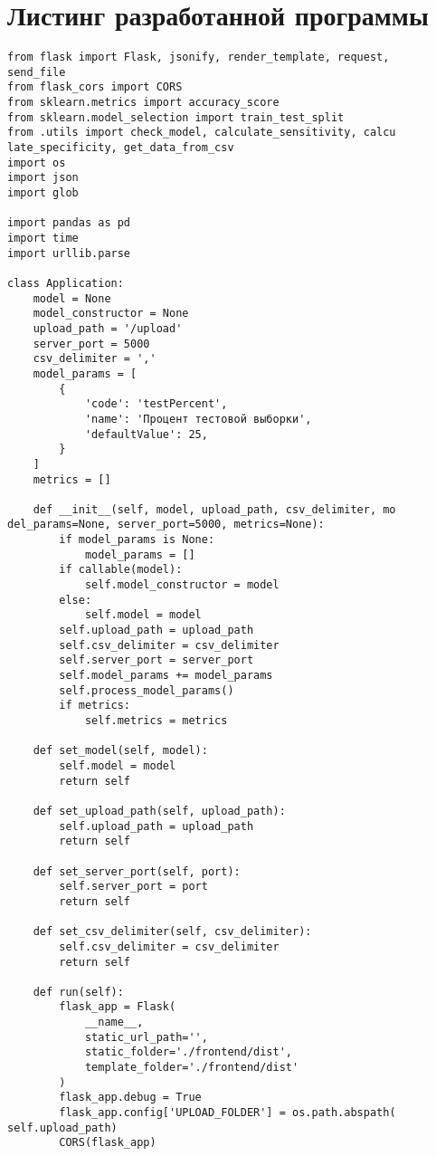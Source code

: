 \chapter{Листинг разработанной программы}

\lstset{extendedchars=\true}
\lstset{keepspaces=\true}
\begin{lstlisting}[caption={Код backend-части приложения}, label={ls:a:01}]
from flask import Flask, jsonify, render_template, request,
send_file
from flask_cors import CORS
from sklearn.metrics import accuracy_score
from sklearn.model_selection import train_test_split
from .utils import check_model, calculate_sensitivity, calcu
late_specificity, get_data_from_csv
import os
import json
import glob

import pandas as pd
import time
import urllib.parse

class Application:
    model = None
    model_constructor = None
    upload_path = '/upload'
    server_port = 5000
    csv_delimiter = ','
    model_params = [
        {
            'code': 'testPercent',
            'name': 'Процент тестовой выборки',
            'defaultValue': 25,
        }
    ]
    metrics = []

    def __init__(self, model, upload_path, csv_delimiter, mo
del_params=None, server_port=5000, metrics=None):
        if model_params is None:
            model_params = []
        if callable(model):
            self.model_constructor = model
        else:
            self.model = model
        self.upload_path = upload_path
        self.csv_delimiter = csv_delimiter
        self.server_port = server_port
        self.model_params += model_params
        self.process_model_params()
        if metrics:
            self.metrics = metrics

    def set_model(self, model):
        self.model = model
        return self

    def set_upload_path(self, upload_path):
        self.upload_path = upload_path
        return self

    def set_server_port(self, port):
        self.server_port = port
        return self

    def set_csv_delimiter(self, csv_delimiter):
        self.csv_delimiter = csv_delimiter
        return self

    def run(self):
        flask_app = Flask(
            __name__,
            static_url_path='',
            static_folder='./frontend/dist',
            template_folder='./frontend/dist'
        )
        flask_app.debug = True
        flask_app.config['UPLOAD_FOLDER'] = os.path.abspath(
self.upload_path)
        CORS(flask_app)


\end{lstlisting}
